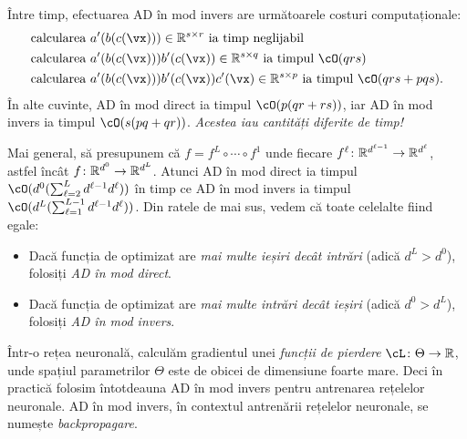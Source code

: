 \documentclass[../../book-main_ro.tex]{subfiles}
\begin{document}
Între timp, efectuarea AD în mod invers are următoarele costuri computaționale:
\begin{align}
    &\text{calcularea}\ a^{\prime}(b(c(\vx))) \in \R^{s \times r}\ \text{ia timp neglijabil} \\
    &\text{calcularea}\ a^{\prime}(b(c(\vx)))b^{\prime}(c(\vx)) \in \R^{s \times q}\ \text{ia timpul \(\cO(qrs)\)} \\
    &\text{calcularea}\ a^{\prime}(b(c(\vx)))b^{\prime}(c(\vx))c^{\prime}(\vx) \in \R^{s \times p}\ \text{ia timpul \(\cO(qrs + pqs)\).}
\end{align}
În alte cuvinte, AD în mod direct ia timpul \(\cO(p(qr + rs))\), iar AD în mod invers ia timpul \(\cO(s(pq + qr))\). \textit{Acestea iau cantități diferite de timp!}

Mai general, să presupunem că \(f = f^{L} \circ \cdots \circ f^{1}\) unde fiecare \(f^{\ell} \colon \mathbb{R}^{d^{\ell - 1}} \to \mathbb{R}^{d^{\ell}}\), astfel încât \(f \colon \mathbb{R}^{d^{0}} \to \mathbb{R}^{d^{L}}\). Atunci AD în mod direct ia timpul \(\cO(d^{0}(\sum_{\ell = 2}^{L}d^{\ell - 1}d^{\ell}))\) în timp ce AD în mod invers ia timpul \(\cO(d^{L}(\sum_{\ell = 1}^{L - 1}d^{\ell - 1}d^{\ell}))\). Din ratele de mai sus, vedem că toate celelalte fiind egale:
\begin{itemize}
    \item Dacă funcția de optimizat are \textit{mai multe ieșiri decât intrări} (adică \(d^{L} > d^{0}\)), folosiți \textit{AD în mod direct}.
    \item Dacă funcția de optimizat are \textit{mai multe intrări decât ieșiri} (adică \(d^{0} > d^{L}\)), folosiți \textit{AD în mod invers}.
\end{itemize}
Într-o rețea neuronală, calculăm gradientul unei \textit{funcții de pierdere} \(\cL \colon \Theta \to \R\), unde spațiul parametrilor \(\Theta\) este de obicei de dimensiune foarte mare. Deci în practică folosim întotdeauna AD în mod invers pentru antrenarea rețelelor neuronale. AD în mod invers, în contextul antrenării rețelelor neuronale, se numește \textit{backpropagare}.
\end{document}

